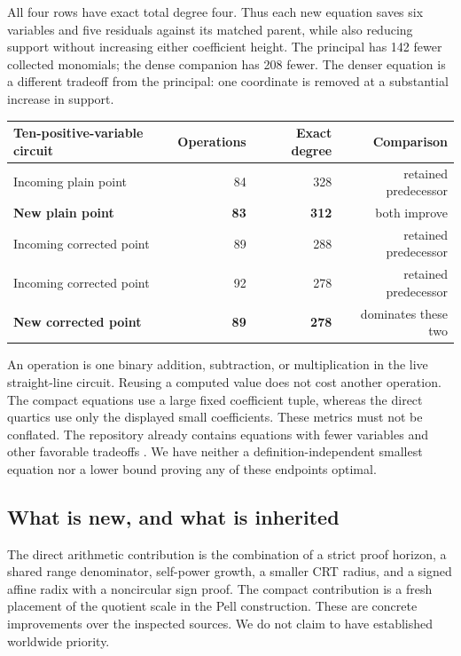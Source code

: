 \documentclass[11pt]{article}
\theoremstyle{definition}
\begin{document}
All four rows have exact total degree four. Thus each new equation saves
six variables and five residuals against its matched parent, while also
reducing support without increasing either coefficient height. The
principal has 142 fewer collected monomials; the dense companion has 208
fewer. The denser equation is a different tradeoff from the principal:
one coordinate is removed at a substantial increase in support.

\begin{center}\small
\begin{tabular}{lrrr}
\toprule
Ten-positive-variable circuit & Operations & Exact degree & Comparison\\
\midrule
Incoming plain point &84&328&retained predecessor\\
\textbf{New plain point} &\textbf{83}&\textbf{312}&both improve\\
Incoming corrected point &89&288&retained predecessor\\
Incoming corrected point &92&278&retained predecessor\\
\textbf{New corrected point} &\textbf{89}&\textbf{278}&dominates these two\\
\bottomrule
\end{tabular}
\end{center}

An operation is one binary addition, subtraction, or multiplication in
the live straight-line circuit. Reusing a computed value does not cost
another operation. The compact equations use a large fixed coefficient
tuple, whereas the direct quartics use only the displayed small
coefficients. These metrics must not be conflated. The repository already
contains equations with fewer variables and other favorable tradeoffs
\cite{repo}. We have neither a definition-independent smallest equation
nor a lower bound proving any of these endpoints optimal.

\subsection{What is new, and what is inherited}

The direct arithmetic contribution is the combination of a strict proof
horizon, a shared range denominator, self-power growth, a smaller CRT
radius, and a signed affine radix with a noncircular sign proof. The
compact contribution is a fresh placement of the quotient scale in the
Pell construction. These are concrete improvements over the inspected
sources. We do not claim to have established worldwide priority.
\end{document}
